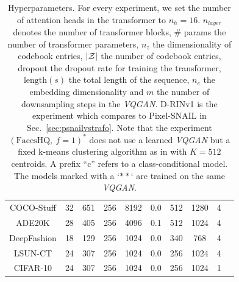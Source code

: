 {\begin{table}[tbp]
\begin{tabular}{c   c c c  c c c c c c}
  COCO-Stuff & 32 & 651 & 256 & 8192 & 0.0 & 512 & 1280 & 4  \\
  ADE20K & 28 & 405 & 256 & 4096 & 0.1 & 512 & 1024 & 4  \\
  DeepFashion & 18 & 129 & 256 & 1024 & 0.0 & 340 & 768 & 4  \\  %
  LSUN-CT & 24 & 307 & 256 & 1024 & 0.0 & 256 & 1024 & 4  \\
  CIFAR-10 & 24 & 307 & 256 & 1024 & 0.0 & 256 & 1024 & 1  \\  %
\bottomrule
\end{tabular}
\caption{Hyperparameters. For every experiment, we set the number of attention
  heads in the transformer to $n_h = 16$. $n_{layer}$ denotes the
  number of transformer blocks, \# params the number of transformer parameters,
  $n_z$ the dimensionality of codebook entries, $\vert \mathcal{Z} \vert$
  the number of codebook entries, dropout the dropout rate for training the
  transformer, $\text{length}(s)$ the total length of the sequence,
  $n_e$ the embedding dimensionality and $m$ the number of downsampling
  steps in the \emph{VQGAN}.
  D-RINv1 is the experiment which compares to Pixel-SNAIL in Sec.~\ref{sec:psnailvstrafo}. Note that the experiment $( \text{FacesHQ}, \: f=1)^*$ does not use a learned \emph{VQGAN} but a fixed k-means clustering algorithm as in \cite{chen2020generative} with $K=512$ centroids. A prefix ``c'' refers to a class-conditional model. The models marked with a `$**$` are trained on the same \emph{VQGAN}.
  }
\label{tab:hyperparameters}
\end{table}
}

